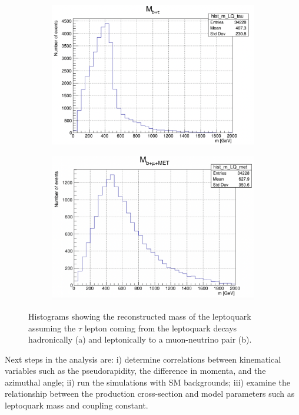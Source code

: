 \begin{figure}
    \centering
    \begin{subfigure}{.5\textwidth}
      \centering
      \includegraphics[width=\linewidth]{images/m-b_tau-muons.png}
      \caption{}
      \label{fig:had-mu}
    \end{subfigure}%
    \begin{subfigure}{.5\textwidth}
      \centering
      \includegraphics[width=\linewidth]{images/m-b_mu.png}
      \caption{}
      \label{fig:lep-mu}
    \end{subfigure}
    \caption{Histograms showing the reconstructed mass of the leptoquark assuming the $\tau$ lepton coming from the leptoquark decays hadronically (a) and leptonically to a muon-neutrino pair (b).}
    \label{fig:recons_mass_mu}
\end{figure}

Next steps in the analysis are: i) determine correlations between kinematical variables such as the pseudorapidity, the difference in momenta, and the azimuthal angle; ii) run the simulations with SM backgrounds; iii) examine the relationship between the production cross-section and model parameters such as leptoquark mass and coupling constant.



